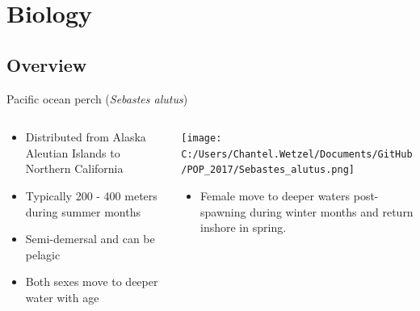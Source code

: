 \documentclass[pdf]{beamer}\usepackage[]{graphicx}\usepackage[]{color}
\begin{document}
\section{Biology}

\subsection{Overview}
\begin{frame}{Pacific ocean perch (\textit{Sebastes alutus})}
\begin{columns}
  \begin{column}{0.5\textwidth}
      \begin{itemize}
        \item Distributed from  Alaska Aleutian Islands to Northern California
        \item Typically 200 - 400 meters during summer months
        \item Semi-demersal and can be pelagic
        \item Both sexes move to deeper water with age
      \end{itemize}
  \end{column}
  
  \begin{column}{0.5\textwidth}
    \texttt{[image: C:/Users/Chantel.Wetzel/Documents/GitHub/POP\_2017/Sebastes\_alutus.png]}
    \begin{itemize}
        \item Female move to deeper waters post-spawning during winter months and return inshore in spring.
      \end{itemize}
  \end{column}
\end{columns}
\end{frame}
\end{document}
